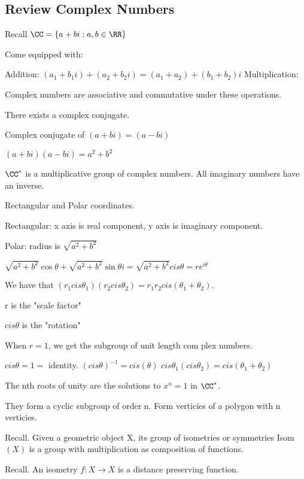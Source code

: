 \documentclass[11pt]{scrartcl}
\begin{document}
\subsection{Review Complex Numbers}

Recall $\CC = \{a + bi: a, b \in \RR\}$

Come equipped with:
\begin{enumerate}
  \ii
  Addition: $(a_1 + b_1i) + (a_2 + b_2i) = (a_1 + a_2) + (b_1 + b_2)i$
  \ii
  Multiplication:
\end{enumerate}

Complex numbers are associative and commutative under these operations.

There exists a complex conjugate.
\begin{example}
  Complex conjugate of $(a + bi) = (a - bi)$
\end{example}
\begin{note}
  $(a + bi)(a - bi) = a^2 + b^2$
\end{note}

$\CC^*$ is a multiplicative group of complex numbers. All imaginary numbers have an inverse.

Rectangular and Polar coordinates.

Rectangular: x axis is real component, y axis is imaginary component.

Polar: radius is $\sqrt{a^2 + b^2}$

$\sqrt{a^2 + b^2}\cos{\theta} + \sqrt{a^2 + b^2}\sin{\theta}i = \sqrt{a^2 + b^2}cis\theta = re^{i\theta}$

We have that $(r_1cis\theta_1)(r_2cis\theta_2) = r_1r_2cis(\theta_1 + \theta_2)$.

r is the "scale factor"

$cis\theta$ is the "rotation"

When $r = 1$, we get the subgroup of unit length com plex numbers.

$cis\theta = 1 =$ identity.
$(cis\theta)^{-1} = cis(\theta)$
$cis\theta_1(cis\theta_2) = cis(\theta_1 + \theta_2)$

The nth roots of unity are the solutions to $x^n = 1$ in $\CC^*$.

They form a cyclic subgroup of order n.
Form verticies of a polygon with n verticies.

Recall. Given a geometric object X, its group of isometries or symmetries Isom$(X)$ is a group with multiplication as composition of functions.

Recall. An isometry $f: X \to X$ is a distance preserving function.
\end{document}
